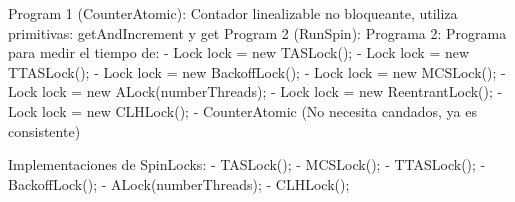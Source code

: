 Program 1 (CounterAtomic): Contador linealizable no bloqueante, utiliza primitivas: getAndIncrement y get
Program 2 (RunSpin): Programa 2: Programa para medir el tiempo de: 
    -		Lock lock = new TASLock();
    -		Lock lock = new TTASLock();
    -		Lock lock = new BackoffLock();
    -		Lock lock = new MCSLock();
    -		Lock lock = new ALock(numberThreads);
    -		Lock lock = new ReentrantLock();
    -		Lock lock = new CLHLock();
    -		CounterAtomic (No necesita candados, ya es consistente)

    Implementaciones de SpinLocks: 
    -   TASLock();
    -	MCSLock();
    -	TTASLock();
    -	BackoffLock();
    -	ALock(numberThreads);
    -	CLHLock();